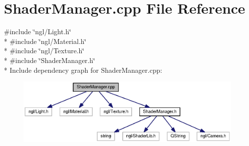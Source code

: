 \section{Shader\-Manager.\-cpp File Reference}
\label{_shader_manager_8cpp}
{\ttfamily \#include \char`\"{}ngl/\-Light.\-h\char`\"{}}\\*
{\ttfamily \#include \char`\"{}ngl/\-Material.\-h\char`\"{}}\\*
{\ttfamily \#include \char`\"{}ngl/\-Texture.\-h\char`\"{}}\\*
{\ttfamily \#include \char`\"{}Shader\-Manager.\-h\char`\"{}}\\*
Include dependency graph for Shader\-Manager.\-cpp\-:
\nopagebreak
\begin{figure}[H]
\begin{center}
\leavevmode
\includegraphics[width=350pt]{_shader_manager_8cpp__incl}
\end{center}
\end{figure}

